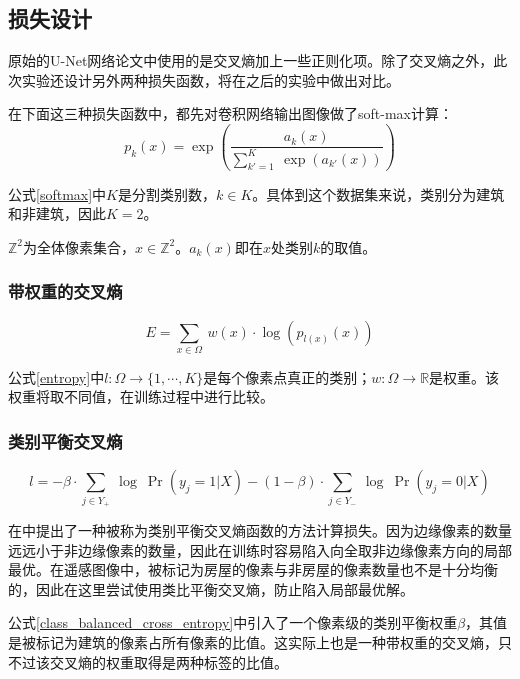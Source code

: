 \subsection{损失设计}
原始的U-Net网络论文中使用的是交叉熵加上一些正则化项。除了交叉熵之外，此次实验还设计另外两种损失函数，将在之后的实验中做出对比。

在下面这三种损失函数中，都先对卷积网络输出图像做了soft-max计算：
\begin{equation}\label{softmax}
p_k(x)=\exp(\frac{a_k(x)}{\sum\limits_{k'=1}^K \ \exp(a_{k'}(x))})
\end{equation}

公式\ref{softmax}中$K$是分割类别数，$k\in K$。具体到这个数据集来说，类别分为建筑和非建筑，因此$K=2$。

$\mathbb{Z}^2$为全体像素集合，$x\in \mathbb{Z}^2$。$a_k(x)$即在$x$处类别$k$的取值。
\subsubsection{带权重的交叉熵}
\begin{equation}\label{entropy}
E=\sum_{x\in \Omega}\ w(x)\cdot \log(p_{l(x)}(x))
\end{equation}

公式\ref{entropy}中$l: \Omega\rightarrow\{1,\cdots,K\}$是每个像素点真正的类别；$w: \Omega\rightarrow\mathbb{R}$是权重。该权重将取不同值，在训练过程中进行比较。
\subsubsection{类别平衡交叉熵}
\begin{equation}\label{class_balanced_cross_entropy}
    l=-\beta\cdot \sum\limits_{j\in Y_+}\ \log\ \Pr(y_j=1|X)-(1-\beta)\cdot \sum\limits_{j\in Y_-}\ \log\ \Pr(y_j=0|X)
\end{equation}

在\cite{xie2015holistically}中提出了一种被称为类别平衡交叉熵函数的方法计算损失。因为边缘像素的数量远远小于非边缘像素的数量，因此在训练时容易陷入向全取非边缘像素方向的局部最优。在遥感图像中，被标记为房屋的像素与非房屋的像素数量也不是十分均衡的，因此在这里尝试使用类比平衡交叉熵，防止陷入局部最优解。

公式\ref{class_balanced_cross_entropy}中引入了一个像素级的类别平衡权重$\beta$，其值是被标记为建筑的像素占所有像素的比值。这实际上也是一种带权重的交叉熵，只不过该交叉熵的权重取得是两种标签的比值。

